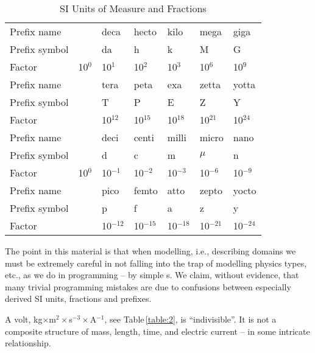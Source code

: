 \normalsize
\mnewfoil
\begin{table}[h]\LLll\center
\begin{tabular}{|lllllll|} \hline %
Prefix name   &      & deca  &  hecto &  kilo &   mega &   giga \\
Prefix symbol &      & da    &  h  &     k   &    M   &    G  \\
Factor        & 10$^0$ & 10$^1$ & 10$^2$ & 10$^3$ & 10$^6$  & 10$^9$\\ \hline
Prefix name   &      &   tera  &  peta  &  exa  &   zetta &  yotta\\
Prefix symbol &      &    T  &     P &      E &      Z &     Y\\
Factor        &&  10$^{12}$  & 10$^{15}$ & 10$^{18}$ & 10$^{21}$ & 10$^{24}$\\ \hline\hline
Prefix name      &    &   deci  &  centi  & milli &  micro &  nano   \\
Prefix symbol     &   &   d   &    c  &     m   &    $\mu$ &       n   \\
Factor        & 10$^0$ & 10$^{-1}$ & 10$^{-2}$ & 10$^{-3}$ & 10$^{-6}$ & 
10$^{-9}$   \\ \hline
Prefix name      &    &     pico &   femto &  atto &   zepto  & yocto\\
Prefix symbol     &   &          p &      f &      a &      z    &   y\\
Factor        &  &  10$^{-12}$  & 10$^{-15}$ & 10$^{-18}$ & 10$^{-21}$ &
10$^{-24}$\\ \hline
\end{tabular}
  \caption{\HHHH SI Units of Measure and Fractions}
  \label{table:6}
\end{table}
\normalsize\HHHH
\mnewfoil
\treprikker
\noindent
\begynd
\pind The point in  this material is
\begynd
\pind that when modelling, i.e., describing domains
\pind we must be extremely careful in not falling into the trap
\pind of modelling physics types, etc.,  as we do in programming --
\pind by simple s.
\afslut
\pind We claim, without evidence, 
\begynd
\pind that many trivial programming mistakes
\pind are due to confusions between especially 
\pind derived SI units, fractions and prefixes.
\afslut
\afslut

\begynd
\pind A volt, kg$\times$m$^2\times$s$^{-3}\times$A$^{-1}$, 
\begynd
\pind see Table\,\ref{table:2}, is ``indivisible''.
\pind It is not a composite structure of
\begynd
\pind mass, %
\pind length, %
\pind time, and %
\pind electric current -- %
\afslut in some intricate relationship.
\afslut
\afslut

